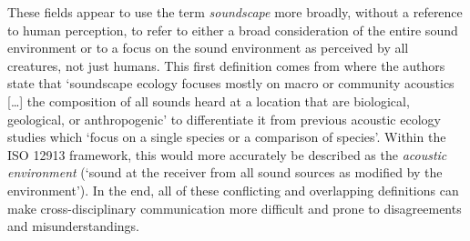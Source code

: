 These fields appear to use the term \emph{soundscape} more broadly, without a reference to human perception, to refer to either a broad consideration of the entire sound environment or to a focus on the sound environment as perceived by all creatures, not just humans. This first definition comes from \citet{Pijanowski2011Soundscape} where the authors state that `soundscape ecology focuses mostly on macro or community acoustics [\dots] the
composition of all sounds heard at a location that are biological, geological, or anthropogenic' to differentiate it from previous acoustic ecology studies which `focus on a single species or a comparison of species'. Within the ISO 12913 framework, this would more accurately be described as the \emph{acoustic environment} (`sound at the receiver from all sound sources as modified by the environment'). In the end, all of these conflicting and overlapping definitions can make cross-disciplinary communication more difficult and prone to disagreements and misunderstandings. 
